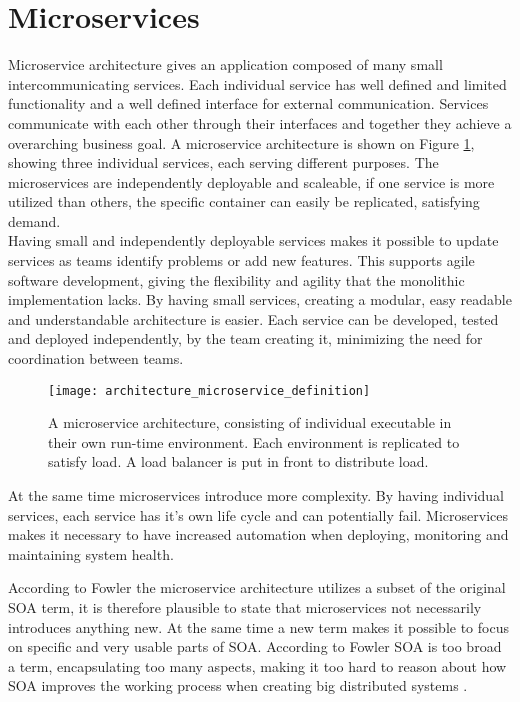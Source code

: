 \section{Microservices}
\label{sec:microservices}
Microservice architecture gives an application composed of many small intercommunicating services. Each individual service has well defined and limited functionality and a well defined interface for external communication. Services communicate with each other through their interfaces and together they achieve a overarching business goal\cite[p.~2]{newman2015microservices}. A microservice architecture is shown on Figure \ref{fig:architecture_microservice_definition}, showing three individual services, each serving different purposes. The microservices are independently deployable and scaleable, if one service is more utilized than others, the specific container can easily be replicated, satisfying demand. \\

Having small and independently deployable services makes it possible to update services as teams identify problems or add new features. This supports agile software development, giving the flexibility and agility that the monolithic implementation lacks. By having small services, creating a modular, easy readable and understandable architecture is easier. Each service can be developed, tested and deployed independently, by the team creating it, minimizing the need for coordination between teams\cite{kniberg2014spotify}.

\begin{figure}[!htb]
\begin{center}
  \texttt{[image: architecture\_microservice\_definition]}  
  \caption{A microservice architecture, consisting of individual executable in their own run-time environment. Each environment is replicated to satisfy load. A load balancer is put in front to distribute load.}
  \label{fig:architecture_microservice_definition}
  \end{center}
\end{figure}

At the same time microservices introduce more complexity. By having individual services, each service has it's own life cycle and can potentially fail. Microservices makes it necessary to have increased automation when deploying, monitoring and maintaining system health\cite{meshenberg2016microservices}.

According to Fowler the microservice architecture utilizes a subset of the original SOA term, it is therefore plausible to state that microservices not necessarily introduces anything new. At the same time a new term makes it possible to focus on specific and very usable parts of SOA. According to Fowler SOA is too broad a term, encapsulating too many aspects, making it too hard to reason about how SOA improves the working process when creating big distributed systems \cite[t.~13:22]{fowler2014microservicesoamonolith}.

